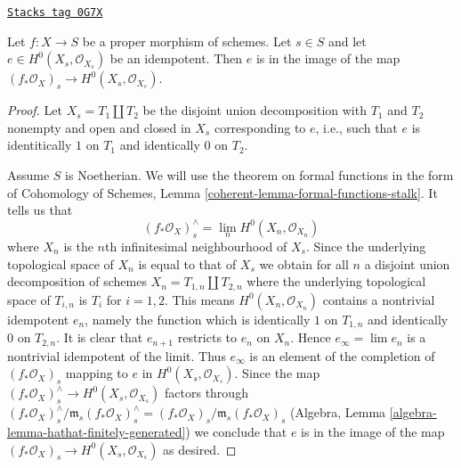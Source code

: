 \begin{lemma}
\label{perfect-lemma-proper-idempotent-on-fibre}
\href{https://stacks.math.columbia.edu/tag/0G7X}{\texttt{Stacks tag 0G7X}}

Let $f : X \to S$ be a proper morphism of schemes. Let $s \in S$
and let $e \in H^0(X_s, \mathcal{O}_{X_s})$ be an idempotent.
Then $e$ is in the image of the map
$(f_*\mathcal{O}_X)_s \to H^0(X_s, \mathcal{O}_{X_s})$.
\end{lemma}

\begin{proof}
Let $X_s = T_1 \amalg T_2$ be the disjoint union decomposition
with $T_1$ and $T_2$ nonempty and open and closed in $X_s$
corresponding to $e$, i.e., such that $e$ is identitically $1$
on $T_1$ and identically $0$ on $T_2$.

\medskip\noindent
Assume $S$ is Noetherian. We will use the theorem on formal functions
in the form of Cohomology of Schemes, Lemma
\ref{coherent-lemma-formal-functions-stalk}.
It tells us that
$$
(f_*\mathcal{O}_X)_s^\wedge = \lim_n H^0(X_n, \mathcal{O}_{X_n})
$$
where $X_n$ is the $n$th infinitesimal neighbourhood of $X_s$.
Since the underlying topological space of $X_n$ is equal to that
of $X_s$ we obtain for all $n $ a disjoint union decomposition of schemes
$X_n = T_{1, n} \amalg T_{2, n}$ where the underlying topological space
of $T_{i, n}$ is $T_i$ for $i = 1, 2$. This means
$H^0(X_n, \mathcal{O}_{X_n})$ contains a nontrivial idempotent $e_n$,
namely the function which is identically $1$ on $T_{1, n}$ and
identically $0$ on $T_{2, n}$. It is clear that $e_{n + 1}$
restricts to $e_n$ on $X_n$. Hence $e_\infty = \lim e_n$
is a nontrivial idempotent of the limit. Thus $e_\infty$
is an element of the completion of $(f_*\mathcal{O}_X)_s$
mapping to $e$ in $H^0(X_s, \mathcal{O}_{X_s})$.
Since the map $(f_*\mathcal{O}_X)_s^\wedge \to H^0(X_s, \mathcal{O}_{X_s})$
factors through
$(f_*\mathcal{O}_X)^\wedge_s / \mathfrak m_s (f_*\mathcal{O}_X)_s^\wedge =
(f_*\mathcal{O}_X)_s / \mathfrak m_s (f_*\mathcal{O}_X)_s$
(Algebra, Lemma \ref{algebra-lemma-hathat-finitely-generated})
we conclude that $e$ is in the image of the
map $(f_*\mathcal{O}_X)_s \to H^0(X_s, \mathcal{O}_{X_s})$
as desired.


\end{proof}
